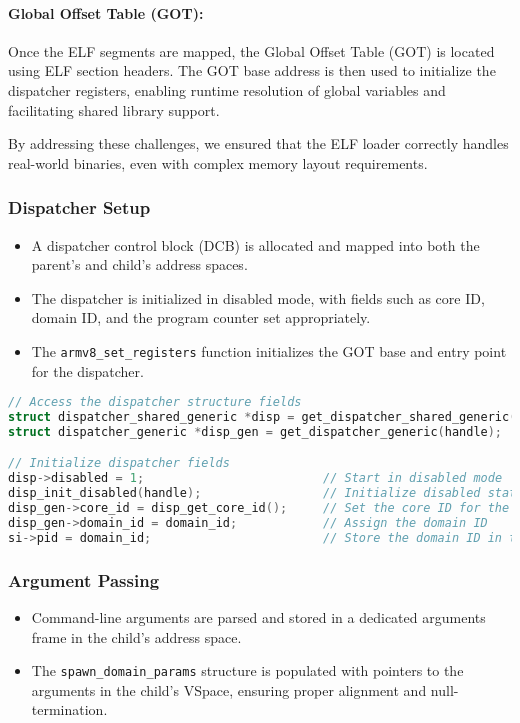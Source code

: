 \paragraph{Global Offset Table (GOT):} Once the ELF segments are mapped, the Global Offset Table (GOT) is located using ELF section headers. The GOT base address is then used to initialize the dispatcher registers, enabling runtime resolution of global variables and facilitating shared library support.

By addressing these challenges, we ensured that the ELF loader correctly handles real-world binaries, even with complex memory layout requirements.

\subsubsection*{Dispatcher Setup}
\begin{itemize}
    \item A dispatcher control block (DCB) is allocated and mapped into both the parent’s and child’s address spaces. 
    \item The dispatcher is initialized in disabled mode, with fields such as core ID, domain ID, and the program counter set appropriately.
    \item The \texttt{armv8\_set\_registers} function initializes the GOT base and entry point for the dispatcher.
\end{itemize}

\begin{lstlisting}[caption={Initializing the dispatcher fields}, label=lst:dispatcher_init, language=C]
// Access the dispatcher structure fields
struct dispatcher_shared_generic *disp = get_dispatcher_shared_generic(handle);
struct dispatcher_generic *disp_gen = get_dispatcher_generic(handle);

// Initialize dispatcher fields
disp->disabled = 1;                         // Start in disabled mode
disp_init_disabled(handle);                 // Initialize disabled state
disp_gen->core_id = disp_get_core_id();     // Set the core ID for the child
disp_gen->domain_id = domain_id;            // Assign the domain ID
si->pid = domain_id;                        // Store the domain ID in the spawninfo struct
\end{lstlisting}


\subsubsection*{Argument Passing}
\begin{itemize}
    \item  Command-line arguments are parsed and stored in a dedicated arguments frame in the child’s address space.
    \item  The \texttt{spawn\_domain\_params} structure is populated with pointers to the arguments in the child’s VSpace, ensuring proper alignment and null-termination.
\end{itemize}

